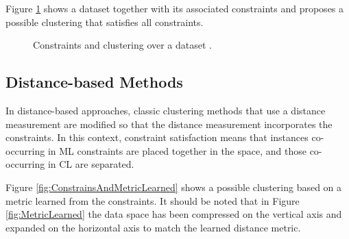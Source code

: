 Figure \ref{fig:ConstClustOverDataset} shows a dataset together with its associated constraints and proposes a possible clustering that satisfies all constraints.

\begin{figure}[bth]
	\myfloatalign
	\hspace{1cm}
	
	\caption[Constraints and clustering over a dataset.]{Constraints and clustering over a dataset \cite{davidson2007survey}.} \label{fig:ConstClustOverDataset}
\end{figure}

\subsection{Distance-based Methods}

In distance-based approaches, classic clustering methods that use a distance measurement are modified so that the distance measurement incorporates the constraints. In this context, constraint satisfaction means that instances co-occurring in \acs{ML} constraints are placed together in the space, and those co-occurring in \acs{CL} are separated.

Figure \ref{fig:ConstrainsAndMetricLearned} shows a possible clustering based on a metric learned from the constraints. It should be noted that in Figure \ref{fig:MetricLearned} the data space has been compressed on the vertical axis and expanded on the horizontal axis to match the learned distance metric.

